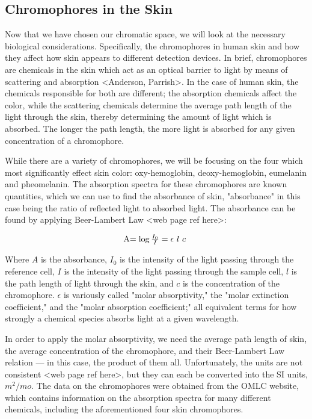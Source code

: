 \subsection{Chromophores in the Skin}

Now that we have chosen our chromatic space, we will look at the necessary biological considerations. Specifically, the chromophores in human skin and how they affect how skin appears to different detection devices. In brief, chromophores are chemicals in the skin which act as an optical barrier to light by means of scattering and absorption <Anderson, Parrish>. In the case of human skin, the chemicals responsible for both are different; the absorption chemicals affect the color, while the scattering chemicals determine the average path length of the light through the skin, thereby determining the amount of light which is absorbed. The longer the path length, the more light is absorbed for any given concentration of a chromophore. 

While there are a variety of chromophores, we will be focusing on the four which most significantly effect skin color: oxy-hemoglobin, deoxy-hemoglobin, eumelanin and pheomelanin. The absorption spectra for these chromophores are known quantities, which we can use to find the absorbance of skin, "absorbance" in this case being the ratio of reflected light to absorbed light. The absorbance can be found by applying Beer-Lambert Law <web page ref here>:

\begin{equation}\label{eq:BeerLambert}
$A$ = \log \frac{I_{0}}{I} = \epsilon $ $ l $ $ c $ $
\end{equation}

Where $A$ is the absorbance, $I_{0}$ is the intensity of the light passing through the reference cell, $I$ is the intensity of the light passing through the sample cell, $l$ is the path length of light through the skin, and $c$ is the concentration of the chromophore. $\epsilon$ is variously called "molar absorptivity," the "molar extinction coefficient," and the "molar absorption coefficient;" all equivalent terms for how strongly a chemical species absorbs light at a given wavelength.

In order to apply the molar absorptivity, we need the average path length of skin, the average concentration of the chromophore, and their Beer-Lambert Law relation --- in this case, the product of them all. Unfortunately, the units are not consistent <web page ref here>, but they can each be converted into the SI units, $m^{2}/mo$. The data on the chromophores were obtained from the OMLC website, which contains information on the absorption spectra for many different chemicals, including the aforementioned four skin chromophores. 

